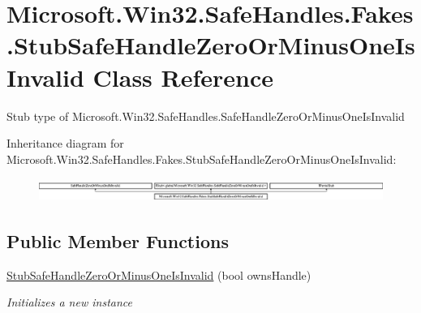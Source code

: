 \hypertarget{class_microsoft_1_1_win32_1_1_safe_handles_1_1_fakes_1_1_stub_safe_handle_zero_or_minus_one_is_invalid}{\section{Microsoft.\-Win32.\-Safe\-Handles.\-Fakes.\-Stub\-Safe\-Handle\-Zero\-Or\-Minus\-One\-Is\-Invalid Class Reference}
\label{class_microsoft_1_1_win32_1_1_safe_handles_1_1_fakes_1_1_stub_safe_handle_zero_or_minus_one_is_invalid}
}


Stub type of Microsoft.\-Win32.\-Safe\-Handles.\-Safe\-Handle\-Zero\-Or\-Minus\-One\-Is\-Invalid 


Inheritance diagram for Microsoft.\-Win32.\-Safe\-Handles.\-Fakes.\-Stub\-Safe\-Handle\-Zero\-Or\-Minus\-One\-Is\-Invalid\-:\begin{figure}[H]
\begin{center}
\leavevmode
\includegraphics[height=0.754209cm]{class_microsoft_1_1_win32_1_1_safe_handles_1_1_fakes_1_1_stub_safe_handle_zero_or_minus_one_is_invalid}
\end{center}
\end{figure}
\subsection*{Public Member Functions}
\begin{DoxyCompactItemize}
\item 
\hyperlink{class_microsoft_1_1_win32_1_1_safe_handles_1_1_fakes_1_1_stub_safe_handle_zero_or_minus_one_is_invalid_a9ab3961c5b15d408aeae04ba4522ed09}{Stub\-Safe\-Handle\-Zero\-Or\-Minus\-One\-Is\-Invalid} (bool owns\-Handle)
\begin{DoxyCompactList}\small\item\em Initializes a new instance\end{DoxyCompactList}\end{DoxyCompactItemize}
